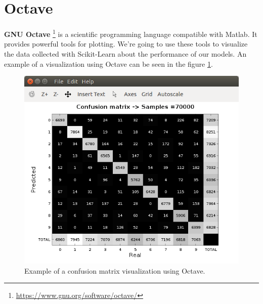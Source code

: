 \section{Octave}
\textbf{GNU Octave} \footnote{\url{https://www.gnu.org/software/octave/}} is a scientific programming language compatible with Matlab. It provides powerful tools for plotting. We're going to use these tools to visualize the data collected with Scikit-Learn about the performance of our models. An example of a visualization using Octave can be seen in the figure \ref{figura:conf_mat}.
\begin{figure}
	\centering
	\includegraphics[width=12cm, keepaspectratio]{figures/conf_mat.png}
	\caption{Example of a confusion matrix visualization using Octave.}
	\label{figura:conf_mat}
\end{figure}